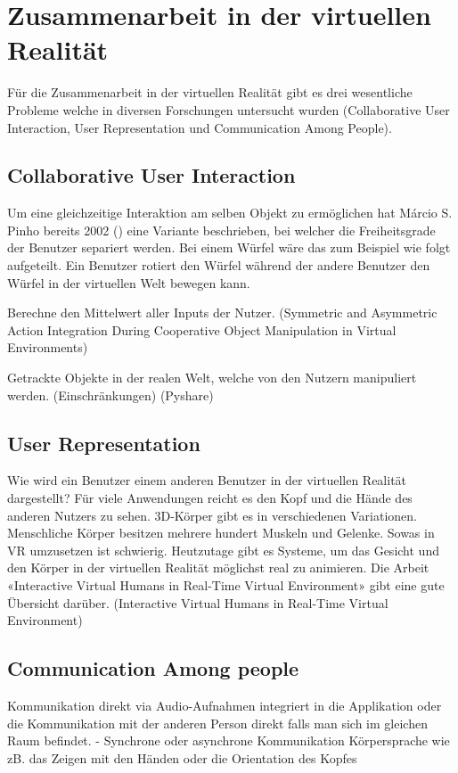 \section{Zusammenarbeit in der virtuellen Realität}
Für die Zusammenarbeit in der virtuellen Realität gibt es drei wesentliche Probleme welche in diversen Forschungen untersucht wurden (Collaborative User Interaction, User Representation und Communication Among People).

\subsection{Collaborative User Interaction}
Um eine gleichzeitige Interaktion am selben Objekt zu ermöglichen hat Márcio S. Pinho bereits 2002 (\cite{pinho_cooperative_2002}) eine Variante beschrieben, bei welcher die Freiheitsgrade der Benutzer separiert werden. Bei einem Würfel wäre das zum Beispiel wie folgt aufgeteilt. Ein Benutzer rotiert den Würfel während der andere Benutzer den Würfel in der virtuellen Welt bewegen kann. 
 
Berechne den Mittelwert aller Inputs der Nutzer. 
(Symmetric and Asymmetric Action Integration During Cooperative Object Manipulation in Virtual Environments)
 
Getrackte Objekte in der realen Welt, welche von den Nutzern manipuliert werden. (Einschränkungen) (Pyshare)
 
\subsection{User Representation}

Wie wird ein Benutzer einem anderen Benutzer in der virtuellen Realität dargestellt? 
Für viele Anwendungen reicht es den Kopf und die Hände des anderen Nutzers zu sehen.
3D-Körper gibt es in verschiedenen Variationen. Menschliche Körper besitzen mehrere hundert Muskeln und Gelenke. Sowas in VR umzusetzen ist schwierig.
Heutzutage gibt es Systeme, um das Gesicht und den Körper in der virtuellen Realität möglichst real zu animieren. Die Arbeit «Interactive Virtual Humans in Real-Time Virtual Environment» gibt eine gute Übersicht darüber. (Interactive Virtual Humans in Real-Time Virtual Environment)


\subsection{Communication Among people}

Kommunikation direkt via Audio-Aufnahmen integriert in die Applikation oder die Kommunikation mit der anderen Person direkt falls man sich im gleichen Raum befindet.
-	Synchrone oder asynchrone Kommunikation
Körpersprache wie zB. das Zeigen mit den Händen oder die Orientation des Kopfes
